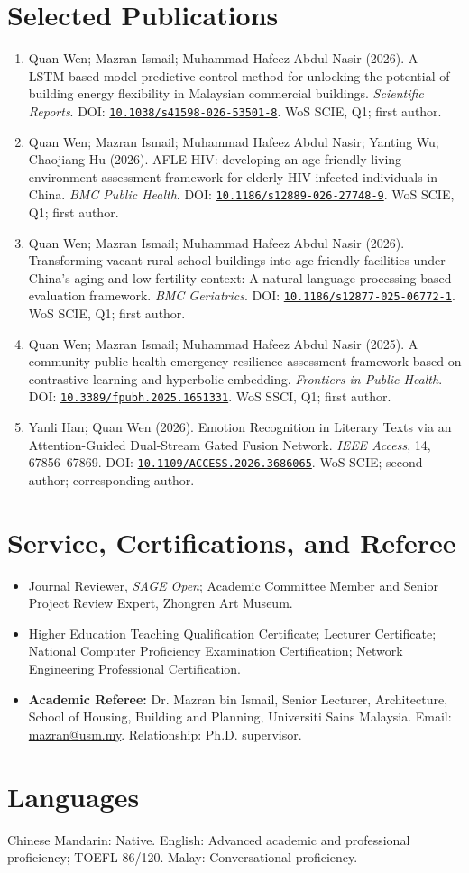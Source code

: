 \documentclass[10pt,a4paper]{article}
\newcommand{\doi}[1]{\href{https://doi.org/#1}{\nolinkurl{#1}}}
\begin{document}
\section*{Selected Publications}
\begin{enumerate}
  \item Quan Wen; Mazran Ismail; Muhammad Hafeez Abdul Nasir (2026). A LSTM-based model predictive control method for unlocking the potential of building energy flexibility in Malaysian commercial buildings. \textit{Scientific Reports}. DOI: \doi{10.1038/s41598-026-53501-8}. WoS SCIE, Q1; first author.
  \item Quan Wen; Mazran Ismail; Muhammad Hafeez Abdul Nasir; Yanting Wu; Chaojiang Hu (2026). AFLE-HIV: developing an age-friendly living environment assessment framework for elderly HIV-infected individuals in China. \textit{BMC Public Health}. DOI: \doi{10.1186/s12889-026-27748-9}. WoS SCIE, Q1; first author.
  \item Quan Wen; Mazran Ismail; Muhammad Hafeez Abdul Nasir (2026). Transforming vacant rural school buildings into age-friendly facilities under China's aging and low-fertility context: A natural language processing-based evaluation framework. \textit{BMC Geriatrics}. DOI: \doi{10.1186/s12877-025-06772-1}. WoS SCIE, Q1; first author.
  \item Quan Wen; Mazran Ismail; Muhammad Hafeez Abdul Nasir (2025). A community public health emergency resilience assessment framework based on contrastive learning and hyperbolic embedding. \textit{Frontiers in Public Health}. DOI: \doi{10.3389/fpubh.2025.1651331}. WoS SSCI, Q1; first author.
  \item Yanli Han; Quan Wen (2026). Emotion Recognition in Literary Texts via an Attention-Guided Dual-Stream Gated Fusion Network. \textit{IEEE Access}, 14, 67856--67869. DOI: \doi{10.1109/ACCESS.2026.3686065}. WoS SCIE; second author; corresponding author.
\end{enumerate}

\section*{Service, Certifications, and Referee}
\begin{itemize}
  \item Journal Reviewer, \textit{SAGE Open}; Academic Committee Member and Senior Project Review Expert, Zhongren Art Museum.
  \item Higher Education Teaching Qualification Certificate; Lecturer Certificate; National Computer Proficiency Examination Certification; Network Engineering Professional Certification.
  \item \textbf{Academic Referee:} Dr. Mazran bin Ismail, Senior Lecturer, Architecture, School of Housing, Building and Planning, Universiti Sains Malaysia. Email: \href{mailto:mazran@usm.my}{mazran@usm.my}. Relationship: Ph.D. supervisor.
\end{itemize}

\section*{Languages}
Chinese Mandarin: Native. English: Advanced academic and professional proficiency; TOEFL 86/120. Malay: Conversational proficiency.
\end{document}
